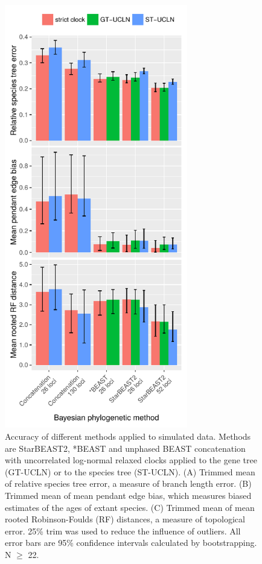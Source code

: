 \documentclass[12pt]{article}
\begin{document}
\clearpage

\begin{figure}[htb!]
\centering
\includegraphics[width=80mm]{tree_error_unphased.pdf}
\caption
{Accuracy of different methods applied to simulated data. Methods are StarBEAST2,
*BEAST and unphased BEAST concatenation with uncorrelated log-normal relaxed clocks applied
to the gene tree (GT-UCLN) or to the species tree (ST-UCLN). (A) Trimmed mean of
relative species tree error, a measure of branch length error. (B) Trimmed
mean of mean pendant edge bias, which measures biased estimates of the ages of
extant species. (C) Trimmed mean of mean rooted Robinson-Foulds (RF) distances, a
measure of topological error. 25\% trim was used to reduce the
influence of outliers. All error bars are 95\% confidence intervals calculated
by bootstrapping. N $\ge$ 22.}
\label{fig:unphasedSpeciesTreeError}
\end{figure}
\end{document}
